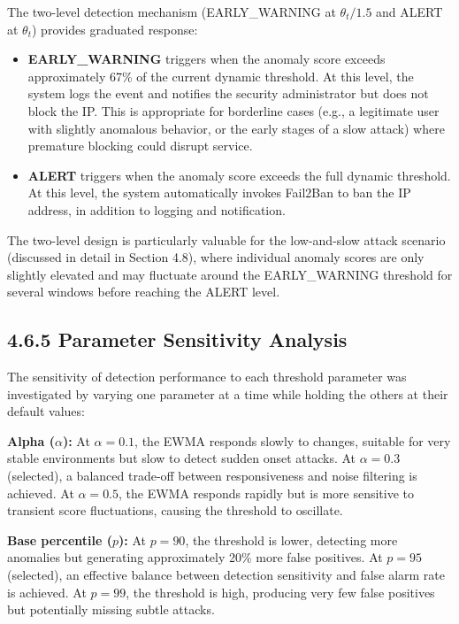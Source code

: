 \documentclass[
  a4paper]{report}
\begin{document}
The two-level detection mechanism (EARLY\_WARNING at \(\theta_t / 1.5\)
and ALERT at \(\theta_t\)) provides graduated response:

\begin{itemize}
\item
  \textbf{EARLY\_WARNING} triggers when the anomaly score exceeds
  approximately 67\% of the current dynamic threshold. At this level,
  the system logs the event and notifies the security administrator but
  does not block the IP. This is appropriate for borderline cases (e.g.,
  a legitimate user with slightly anomalous behavior, or the early
  stages of a slow attack) where premature blocking could disrupt
  service.
\item
  \textbf{ALERT} triggers when the anomaly score exceeds the full
  dynamic threshold. At this level, the system automatically invokes
  Fail2Ban to ban the IP address, in addition to logging and
  notification.
\end{itemize}

The two-level design is particularly valuable for the low-and-slow
attack scenario (discussed in detail in Section 4.8), where individual
anomaly scores are only slightly elevated and may fluctuate around the
EARLY\_WARNING threshold for several windows before reaching the ALERT
level.

\subsection{4.6.5 Parameter Sensitivity
Analysis}\label{parameter-sensitivity-analysis}

The sensitivity of detection performance to each threshold parameter was
investigated by varying one parameter at a time while holding the others
at their default values:

\textbf{Alpha (\(\alpha\)):} At \(\alpha = 0.1\), the EWMA responds
slowly to changes, suitable for very stable environments but slow to
detect sudden onset attacks. At \(\alpha = 0.3\) (selected), a balanced
trade-off between responsiveness and noise filtering is achieved. At
\(\alpha = 0.5\), the EWMA responds rapidly but is more sensitive to
transient score fluctuations, causing the threshold to oscillate.

\textbf{Base percentile (\(p\)):} At \(p = 90\), the threshold is lower,
detecting more anomalies but generating approximately 20\% more false
positives. At \(p = 95\) (selected), an effective balance between
detection sensitivity and false alarm rate is achieved. At \(p = 99\),
the threshold is high, producing very few false positives but
potentially missing subtle attacks.
\end{document}
